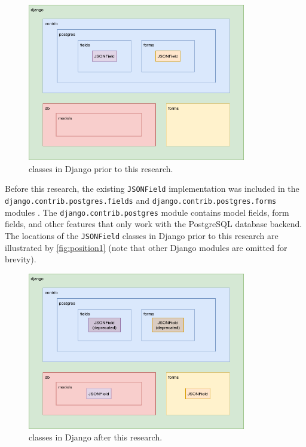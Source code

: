 \begin{figure}
	\centering
    \includegraphics[width=0.85\textwidth]{pics/position1.png}
	\caption{ classes in Django prior to this research.}
	\label{fig:position1}
\end{figure}

Before this research, the existing \verb|JSONField| implementation was included
in the \verb|django.contrib.postgres.fields| and
\verb|django.contrib.postgres.forms| modules \cite{django30_modeljsonfield,
django30_formjsonfield}. The \verb|django.contrib.postgres| module contains
model fields, form fields, and other features that only work with the
PostgreSQL database backend. The locations of the \verb|JSONField| classes in
Django prior to this research are illustrated by \autoref{fig:position1} (note
that other Django modules are omitted for brevity).

\begin{figure}
	\centering
    \includegraphics[width=0.85\textwidth]{pics/position2.png}
	\caption{ classes in Django after this research.}
	\label{fig:position2}
\end{figure}

